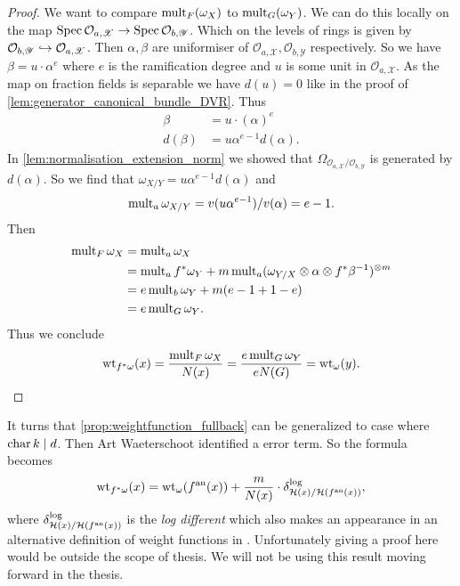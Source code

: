 \begin{proof}
	We want to compare $\operatorname{mult}_{F}(\omega_X)$ to $\operatorname{mult}_{G}(\omega_Y)$. 
	We can do this locally on the map $\operatorname{Spec} \mathcal{O}_{a, \mathscr X} \to \operatorname{Spec} \mathcal{O}_{b, \mathscr Y}$.
	Which on the levels of rings is given by $ \mathcal{O}_{b, \mathscr Y}\hookrightarrow  \mathcal{O}_{a, \mathscr X}$.
	Then $\alpha, \beta$ are uniformiser of $\mathcal{O}_{a, \mathscr X}, \mathcal{O}_{b, \mathscr Y}$ respectively. 
	So we have $\beta = u\cdot \alpha ^{e}$ where $e$ is the ramification degree and $u$ is some unit in $\mathcal{O}_{a, \mathscr X}$. 
	As the map on fraction fields is separable we have $d(u) = 0$ like in the proof of \cref{lem:generator_canonical_bundle_DVR}. 
	Thus
	\begin{align*}
		\beta &= u \cdot (\alpha)^e \\
		d(\beta) &= u \alpha^{e-1} d(\alpha)
	.\end{align*}
	In \cref{lem:normalisation_extension_norm} we showed that $\Omega_{\mathcal{O}_{a, \mathscr X} / \mathcal{O}_{b, \mathscr Y}}$ is generated by $d(\alpha)$. 
	So we find that $\omega_{X / Y} = u \alpha ^{e-1} d(\alpha)$ and \[
		\operatorname{mult}_{a} \omega_{X / Y} = v(u \alpha ^{e-1}) / v(\alpha) = e-1
	.\] 
	Then  
	\begin{align*}
		\operatorname{mult}_{F} \omega_X &= \operatorname{mult}_{a} \omega _X\\
				   &=  \operatorname{mult}_{a} f^*\omega_Y +  m \operatorname{mult}_{a} (\omega_{Y / X} \otimes \alpha \otimes f^*\beta ^{-1})^{\otimes m} \\
				   &= e \operatorname{mult}_b \omega_Y + m(e-1 + 1 -e) \\
				   &= e\operatorname{mult}_{G}\omega_Y 
	.\end{align*} 
	Thus we conclude 
	 \[
		 \operatorname{wt}_{f^* \omega}(x) = \frac{\operatorname{mult}_{F} \omega_X}{N(x)} = \frac{e\operatorname{mult}_G \omega_Y}{eN(G)} = \operatorname{wt}_{\omega}(y)
	.\] 
\end{proof}

\begin{remark}\label{rem:weightfunction_fullback_art} 
	It turns that \cref{prop:weightfunction_fullback} can be generalized to case where $\operatorname{char} k \mid d$. 
	Then Art Waeterschoot identified a error term. 
	So the formula becomes \[
		\operatorname{wt}_{f^* \omega}(x) = \operatorname{wt}_{\omega}(f{}^{\text{an}} (x)) + \frac{m}{N(x)} \cdot \delta_{\mathcal{H} (x) / \mathcal{H} (f{}^{\text{an}}(x))}^{\text{log}}
	,\] 
	where $\delta_{\mathcal{H} (x) / \mathcal{H} (f{}^{\text{an}}(x))}^{\text{log}}$ is the \emph{log different} which also makes an appearance in an alternative definition of weight functions in \cite{temkinMetrizationDifferentialPluriforms2016a}.
	Unfortunately giving a proof here would be outside the scope of thesis.
	We will not be using this result moving forward in the thesis. 
\end{remark}


